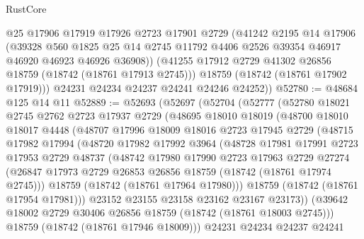 \begin{lexlean}{RustCore}
\begin{coremodule}
          @25
          @17906
          @17919
          @17926
          @2723
          @17901
          @2729
          (@41242
            @2195
            @14
            @17906
            (@39328
              @560
              @1825
              @25
              @14
              @2745
              @11792
              @4406
              @2526
              @39354
              @46917
              @46920
              @46923
              @46926
              @36908))
          (@41255 @17912 @2729 @41302 @26856 @18759 (@18742 (@18761 @17913 @2745)))
          @18759
          (@18742 (@18761 @17902 @17919)))
        @24231
        @24234
        @24237
        @24241
        @24246
        @24252))
@52780 := @48684 @125 @14 @11
@52889 := @52693
    (@52697
      (@52704
        (@52777
          (@52780
            @18021
            @2745
            @2762
            @2723
            @17937
            @2729
            (@48695
              @18010
              @18019
              (@48700
                @18010
                @18017
                @4448
                (@48707
                  @17996
                  @18009
                  @18016
                  @2723
                  @17945
                  @2729
                  (@48715
                    @17982
                    @17994
                    (@48720
                      @17982
                      @17992
                      @3964
                      (@48728
                        @17981
                        @17991
                        @2723
                        @17953
                        @2729
                        @48737
                        (@48742
                          @17980
                          @17990
                          @2723
                          @17963
                          @2729
                          @27274
                          (@26847 @17973 @2729 @26853 @26856 @18759 (@18742 (@18761 @17974 @2745)))
                          @18759
                          (@18742 (@18761 @17964 @17980)))
                        @18759
                        (@18742 (@18761 @17954 @17981)))
                      @23152
                      @23155
                      @23158
                      @23162
                      @23167
                      @23173))
                  (@39642 @18002 @2729 @30406 @26856 @18759 (@18742 (@18761 @18003 @2745)))
                  @18759
                  (@18742 (@18761 @17946 @18009)))
                @24231
                @24234
                @24237
                @24241

\end{coremodule}
\end{lexlean}
